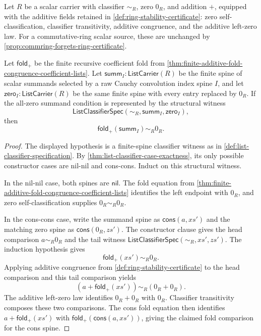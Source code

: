 \begin{theorem}
\label{thm:zero-convolution-summands-fold-zero}
Let \(R\) be a scalar carrier with classifier \(\sim_R\), zero \(0_R\), and addition \(+\), equipped with the additive fields retained in \autoref{def:ring-stability-certificate}: zero self-classification, classifier transitivity, additive congruence, and the additive left-zero law. For a commutative-ring scalar source, these are unchanged by \autoref{prop:commring-forgets-ring-certificate}.

Let \(\mathsf{fold}_{+}\) be the finite recursive coefficient fold from \autoref{thm:finite-additive-fold-congruence-coefficient-lists}. Let \(\mathsf{summ}_I:\mathsf{ListCarrier}(R)\) be the finite spine of scalar summands selected by a raw Cauchy convolution index spine \(I\), and let \(\mathsf{zero}_I:\mathsf{ListCarrier}(R)\) be the same finite spine with every entry replaced by \(0_R\). If the all-zero summand condition is represented by the structural witness
$$
\mathsf{ListClassifierSpec}(\sim_R,\mathsf{summ}_I,\mathsf{zero}_I),
$$
then
$$
\mathsf{fold}_{+}(\mathsf{summ}_I)\sim_R0_R.
$$
\end{theorem}
\begin{proof}
The displayed hypothesis is a finite-spine classifier witness as in \autoref{def:list-classifier-specification}. By \autoref{thm:list-classifier-case-exactness}, its only possible constructor cases are nil-nil and cons-cons. Induct on this structural witness.

In the nil-nil case, both spines are \(\mathsf{nil}\). The fold equation from \autoref{thm:finite-additive-fold-congruence-coefficient-lists} identifies the left endpoint with \(0_R\), and zero self-classification supplies \(0_R\sim_R0_R\).

In the cons-cons case, write the summand spine as \(\mathsf{cons}(a,xs')\) and the matching zero spine as \(\mathsf{cons}(0_R,zs')\). The constructor clause gives the head comparison \(a\sim_R0_R\) and the tail witness \(\mathsf{ListClassifierSpec}(\sim_R,xs',zs')\). The induction hypothesis gives
$$
\mathsf{fold}_{+}(xs')\sim_R0_R.
$$
Applying additive congruence from \autoref{def:ring-stability-certificate} to the head comparison and this tail comparison yields
$$
(a+\mathsf{fold}_{+}(xs'))\sim_R(0_R+0_R).
$$
The additive left-zero law identifies \(0_R+0_R\) with \(0_R\). Classifier transitivity composes these two comparisons. The cons fold equation then identifies \(a+\mathsf{fold}_{+}(xs')\) with \(\mathsf{fold}_{+}(\mathsf{cons}(a,xs'))\), giving the claimed fold comparison for the cons spine.
\end{proof}

